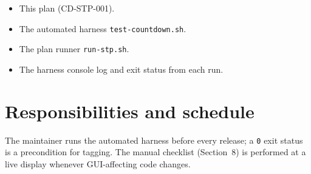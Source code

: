 \documentclass[12pt]{article}
\newcommand{\code}[1]{\texttt{#1}}
\begin{document}
\begin{itemize}[noitemsep]
  \item This plan (CD-STP-001).
  \item The automated harness \code{test-countdown.sh}.
  \item The plan runner \code{run-stp.sh}.
  \item The harness console log and exit status from each run.
\end{itemize}

\section{Responsibilities and schedule}

The maintainer runs the automated harness before every release; a \code{0}
exit status is a precondition for tagging.  The manual checklist
(Section~8) is performed at a live display whenever GUI-affecting code
changes.
\end{document}
